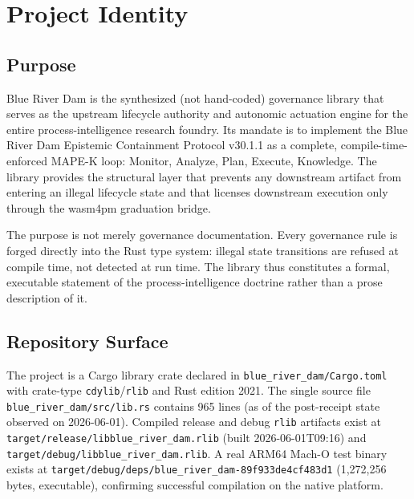 
\section{Project Identity}
\label{sec:blue-river-dam-identity}

\subsection{Purpose}
\label{sec:blue-river-dam-identity-purpose}

Blue River Dam is the synthesized (not hand-coded) governance library that
serves as the upstream lifecycle authority and autonomic actuation engine for
the entire process-intelligence research foundry. Its mandate is to implement
the Blue River Dam Epistemic Containment Protocol v30.1.1 as a complete,
compile-time-enforced MAPE-K loop: Monitor, Analyze, Plan, Execute,
Knowledge. The library provides the structural layer that prevents any
downstream artifact from entering an illegal lifecycle state and that
licenses downstream execution only through the wasm4pm graduation bridge.

The purpose is not merely governance documentation. Every governance rule
is forged directly into the Rust type system: illegal state transitions are
refused at compile time, not detected at run time. The library thus constitutes
a formal, executable statement of the process-intelligence doctrine rather
than a prose description of it.

\subsection{Repository Surface}
\label{sec:blue-river-dam-identity-surface}

The project is a Cargo library crate declared in
\texttt{blue\_river\_dam/Cargo.toml} with crate-type \texttt{cdylib}/\texttt{rlib}
and Rust edition 2021. The single source file
\texttt{blue\_river\_dam/src/lib.rs} contains 965 lines (as of the post-receipt
state observed on 2026-06-01). Compiled release and debug \texttt{rlib}
artifacts exist at
\texttt{target/release/libblue\_river\_dam.rlib} (built 2026-06-01T09:16) and
\texttt{target/debug/libblue\_river\_dam.rlib}. A real ARM64 Mach-O test binary
exists at
\texttt{target/debug/deps/blue\_river\_dam-89f933de4cf483d1} (1{,}272{,}256 bytes,
executable), confirming successful compilation on the native platform.

